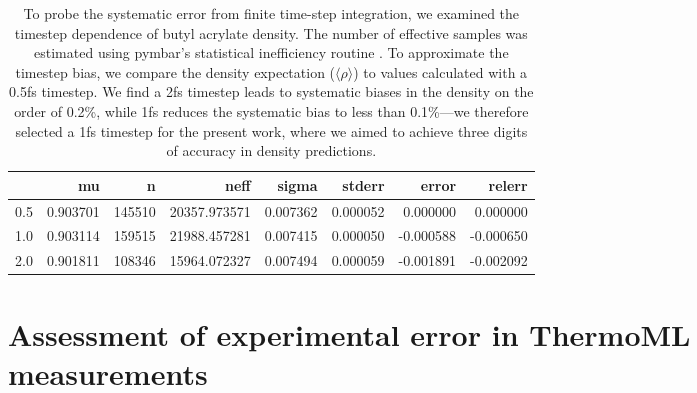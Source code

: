 \documentclass[aps,pre,twocolumn,nofootinbib,superscriptaddress,linenumbers]{revtex4-1}
\begin{document}
\begin{table}
\begin{tabular}{lrrrrrrr}
\toprule
{} &        mu &       n &          neff &     sigma &    stderr &     error &    relerr \\
\midrule
0.5 &  0.903701 &  145510 &  20357.973571 &  0.007362 &  0.000052 &  0.000000 &  0.000000 \\
1.0 &  0.903114 &  159515 &  21988.457281 &  0.007415 &  0.000050 & -0.000588 & -0.000650 \\
2.0 &  0.901811 &  108346 &  15964.072327 &  0.007494 &  0.000059 & -0.001891 & -0.002092 \\
\bottomrule
\end{tabular}
\caption{To probe the systematic error from finite time-step integration, we examined the timestep dependence of butyl acrylate density.  
The number of effective samples was estimated using pymbar's statistical inefficiency routine \cite{shirts2008statistically}.  
To approximate the timestep bias, we compare the density expectation ($\langle \rho \rangle$) to values calculated with a 0.5fs timestep.  
We find a 2fs timestep leads to systematic biases in the density on the order of 0.2\%, while 1fs reduces the systematic bias to less than 0.1\%---we therefore selected a 1fs timestep for the present work, where we aimed to achieve three digits of accuracy in density predictions.
}
\label{table:TimestepDependence}
\end{table}


\section{Assessment of experimental error in ThermoML measurements}
\label{section:experimental-error}

\end{document}
